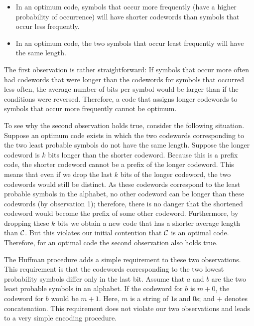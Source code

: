 \begin{itemize}
    \item In an optimum code, symbols that occur more frequently (have a higher probability of occurrence) will have shorter codewords than symbols that occur less frequently.
    
    \item  In an optimum code, the two symbols that occur least frequently will have the same length.
\end{itemize}


 The first observation is rather straightforward: If symbols that occur more often had codewords that were longer than the codewords for symbols that occurred less often, the average number of bits per symbol would be larger than if the conditions were reversed. Therefore, a code that assigns longer codewords to symbols that occur more frequently cannot be optimum.
 
 To see why the second observation holds true, consider the following situation. Suppose an optimum code exists in which the two codewords corresponding to the two least probable symbols do not have the same length. Suppose the longer codeword is $k$ bits longer than the shorter codeword. Because this is a prefix code, the shorter codeword cannot be a prefix of the longer codeword. This means that even if we drop the last $k$ bits of the longer codeword, the two codewords would still be distinct. As these codewords correspond to the least probable symbols in the alphabet, no other codeword can be longer than these codewords (by observation 1); therefore, there is no danger that the shortened codeword would become the prefix of some other codeword. Furthermore, by dropping these $k$ bits we obtain a new code that has a shorter average length than $\mathcal{C}$. But this violates our initial contention that $\mathcal{C}$ is an optimal code. Therefore, for an optimal code the second observation also holds true.

 The Huffman procedure adds a simple requirement to these two observations. This requirement is that the codewords corresponding to the two lowest probability symbols differ only in the last bit. Assume that $a$ and $b$ are the two least probable symbols in an alphabet. If the codeword for $b$ is $m+0$, the codeword for $b$ would be $m + 1$. Here, $m$ is a string of $1$s and $0$s; and $+$ denotes concatenation. This requirement does not violate our two observations and leads to a very simple encoding procedure.



